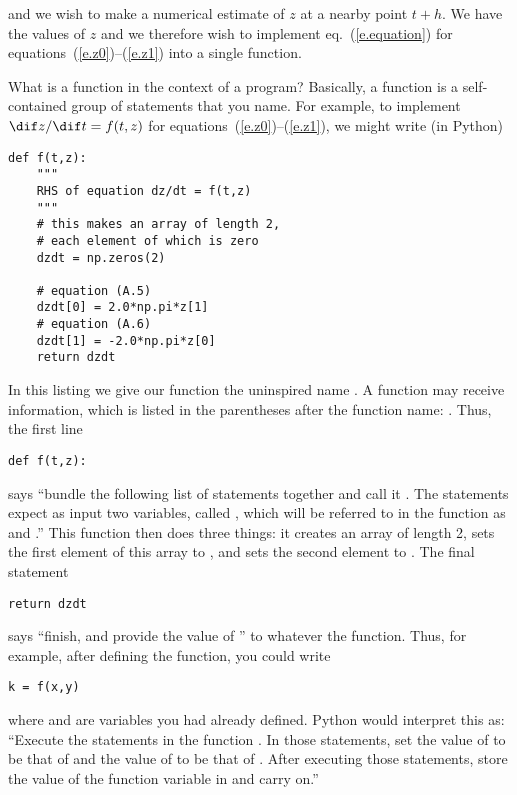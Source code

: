 and we wish to make a numerical estimate of $z$ at a nearby point $t+h$. We have the values of $z$ and we therefore wish to implement eq.~(\ref{e.equation}) 
for equations~(\ref{e.z0})--(\ref{e.z1}) into a single function.

\begin{sidebar}[Functions]
What is a function in the context of a program? Basically, a function is a self-contained group of statements that you name. For example, to implement $\dif z/\dif t = f(t,z)$ for equations~(\ref{e.z0})--(\ref{e.z1}), we might write (in Python)
\begin{Verbatim}[numbers=none]
def f(t,z):
    """
    RHS of equation dz/dt = f(t,z)
    """
    # this makes an array of length 2,
    # each element of which is zero
    dzdt = np.zeros(2)

    # equation (A.5)
    dzdt[0] = 2.0*np.pi*z[1]
    # equation (A.6)
    dzdt[1] = -2.0*np.pi*z[0]
    return dzdt
\end{Verbatim}
In this listing we give our function the uninspired name . A function may receive information, which is listed in the parentheses after the function name: . Thus, the first line
\begin{Verbatim}[numbers=none]
def f(t,z):
\end{Verbatim}
says ``bundle the following list of statements together and call it . The statements expect as input two variables, called , which will be referred to in the function as  and .''
This function then does three things: it creates an array  of length 2, sets the first element of this array to , and sets the second element to . The final statement
\begin{Verbatim}[numbers=none]
    return dzdt
\end{Verbatim}
says ``finish, and provide the value of '' to whatever  the function. Thus, for example, after defining the function, you could write
\begin{Verbatim}[numbers=none]
k = f(x,y)
\end{Verbatim}
where  and  are variables you had already defined.
Python would interpret this as: ``Execute the statements in the function . In those statements, set the value of  to be that of  and the value of  to be that of . After executing those statements, store the value of the function variable   in  and carry on.''
\end{sidebar}

